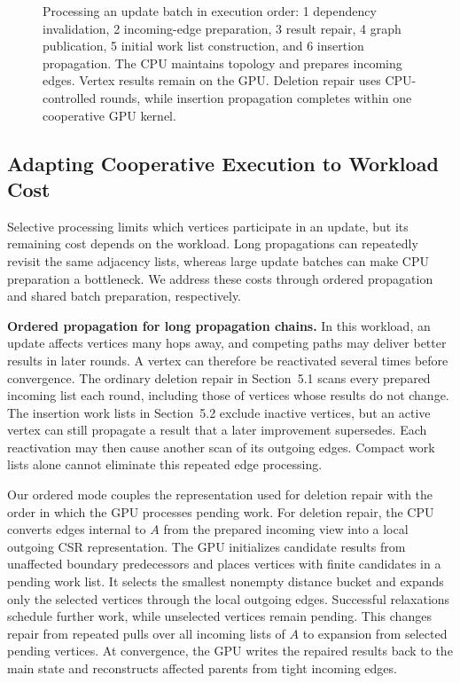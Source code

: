 \begin{figure}[t]
\centering
{}
\caption{Processing an update batch in execution order: 1 dependency invalidation, 2 incoming-edge preparation, 3 result repair, 4 graph publication, 5 initial work list construction, and 6 insertion propagation. The CPU maintains topology and prepares incoming edges. Vertex results remain on the GPU. Deletion repair uses CPU-controlled rounds, while insertion propagation completes within one cooperative GPU kernel.}
\label{fig:3}
\end{figure}



\subsection{Adapting Cooperative Execution to Workload Cost}


Selective processing limits which vertices participate in an update, but its remaining cost depends on the workload. Long propagations can repeatedly revisit the same adjacency lists, whereas large update batches can make CPU preparation a bottleneck. We address these costs through ordered propagation and shared batch preparation, respectively.

\textbf{Ordered propagation for long propagation chains.} In this workload, an update affects vertices many hops away, and competing paths may deliver better results in later rounds. A vertex can therefore be reactivated several times before convergence. The ordinary deletion repair in Section~5.1 scans every prepared incoming list each round, including those of vertices whose results do not change. The insertion work lists in Section~5.2 exclude inactive vertices, but an active vertex can still propagate a result that a later improvement supersedes. Each reactivation may then cause another scan of its outgoing edges. Compact work lists alone cannot eliminate this repeated edge processing.

Our ordered mode couples the representation used for deletion repair with the order in which the GPU processes pending work. For deletion repair, the CPU converts edges internal to $A$ from the prepared incoming view into a local outgoing CSR representation. The GPU initializes candidate results from unaffected boundary predecessors and places vertices with finite candidates in a pending work list. It selects the smallest nonempty distance bucket and expands only the selected vertices through the local outgoing edges. Successful relaxations schedule further work, while unselected vertices remain pending. This changes repair from repeated pulls over all incoming lists of $A$ to expansion from selected pending vertices. At convergence, the GPU writes the repaired results back to the main state and reconstructs affected parents from tight incoming edges.

